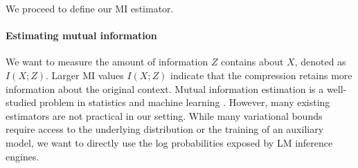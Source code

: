 \documentclass{article} %
\begin{document}


We proceed to define our MI estimator. %

\paragraph*{Estimating mutual information} 
\label{sec:mi-methods}
We want to measure the amount of information $Z$ contains about $X$, denoted as $I(X;Z)$. Larger MI values $I(X;Z)$ indicate that the compression retains more information about the original context. 
Mutual information estimation is a well-studied problem in statistics and machine learning \citep{murphy2023probabilistic, poole2019variational, paninski2003mi, mcallester2020formal, belghazi2018mine}.
However, many existing estimators are not practical in our setting. While many variational bounds require access to the underlying distribution or the training of an auxiliary model, we want to directly use the log probabilities exposed by LM inference engines.
\end{document}
